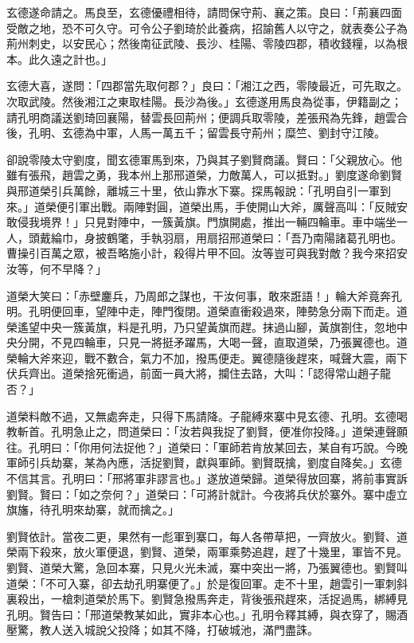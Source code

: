 玄德遂命請之。馬良至，玄德優禮相待，請問保守荊、襄之策。良曰：「荊襄四面受敵之地，恐不可久守。可令公子劉琦於此養病，招諭舊人以守之，就表奏公子為荊州刺史，以安民心；然後南征武陵、長沙、桂陽、零陵四郡，積收錢糧，以為根本。此久遠之計也。」

玄德大喜，遂問：「四郡當先取何郡？」良曰：「湘江之西，零陵最近，可先取之。次取武陵。然後湘江之東取桂陽。長沙為後。」玄德遂用馬良為從事，伊籍副之；請孔明商議送劉琦回襄陽，替雲長回荊州；便調兵取零陵，差張飛為先鋒，趙雲合後，孔明、玄德為中軍，人馬一萬五千；留雲長守荊州；糜竺、劉封守江陵。

卻說零陵太守劉度，聞玄德軍馬到來，乃與其子劉賢商議。賢曰：「父親放心。他雖有張飛，趙雲之勇，我本州上那邢道榮，力敵萬人，可以抵對。」劉度遂命劉賢與邢道榮引兵萬餘，離城三十里，依山靠水下寨。探馬報說：「孔明自引一軍到來。」道榮便引軍出戰。兩陣對圓，道榮出馬，手使開山大斧，厲聲高叫：「反賊安敢侵我境界！」只見對陣中，一簇黃旗。門旗開處，推出一輛四輪車。車中端坐一人，頭戴綸巾，身披鶴氅，手執羽扇，用扇招邢道榮曰：「吾乃南陽諸葛孔明也。曹操引百萬之眾，被吾略施小計，殺得片甲不回。汝等豈可與我對敵？我今來招安汝等，何不早降？」

道榮大笑曰：「赤壁鏖兵，乃周郎之謀也，干汝何事，敢來誑語！」輪大斧竟奔孔明。孔明便回車，望陣中走，陣門復閉。道榮直衝殺過來，陣勢急分兩下而走。道榮遙望中央一簇黃旗，料是孔明，乃只望黃旗而趕。抹過山腳，黃旗劄住，忽地中央分開，不見四輪車，只見一將挺矛躍馬，大喝一聲，直取道榮，乃張翼德也。道榮輪大斧來迎，戰不數合，氣力不加，撥馬便走。翼德隨後趕來，喊聲大震，兩下伏兵齊出。道榮捨死衝過，前面一員大將，攔住去路，大叫：「認得常山趙子龍否？」

道榮料敵不過，又無處奔走，只得下馬請降。子龍縛來寨中見玄德、孔明。玄德喝教斬首。孔明急止之，問道榮曰：「汝若與我捉了劉賢，便准你投降。」道榮連聲願往。孔明曰：「你用何法捉他？」道榮曰：「軍師若肯放某回去，某自有巧說。今晚軍師引兵劫寨，某為內應，活捉劉賢，獻與軍師。劉賢既擒，劉度自降矣。」玄德不信其言。孔明曰：「邢將軍非謬言也。」遂放道榮歸。道榮得放回寨，將前事實訴劉賢。賢曰：「如之奈何？」道榮曰：「可將計就計。今夜將兵伏於寨外。寨中虛立旗旛，待孔明來劫寨，就而擒之。」

劉賢依計。當夜二更，果然有一彪軍到寨口，每人各帶草把，一齊放火。劉賢、道榮兩下殺來，放火軍便退，劉賢、道榮，兩軍乘勢追趕，趕了十幾里，軍皆不見。劉賢、道榮大驚，急回本寨，只見火光未滅，寨中突出一將，乃張翼德也。劉賢叫道榮：「不可入寨，卻去劫孔明寨便了。」於是復回軍。走不十里，趙雲引一軍刺斜裏殺出，一槍刺道榮於馬下。劉賢急撥馬奔走，背後張飛趕來，活捉過馬，綁縛見孔明。賢告曰：「邢道榮教某如此，實非本心也。」孔明令釋其縛，與衣穿了，賜酒壓驚，教人送入城說父投降；如其不降，打破城池，滿門盡誅。

